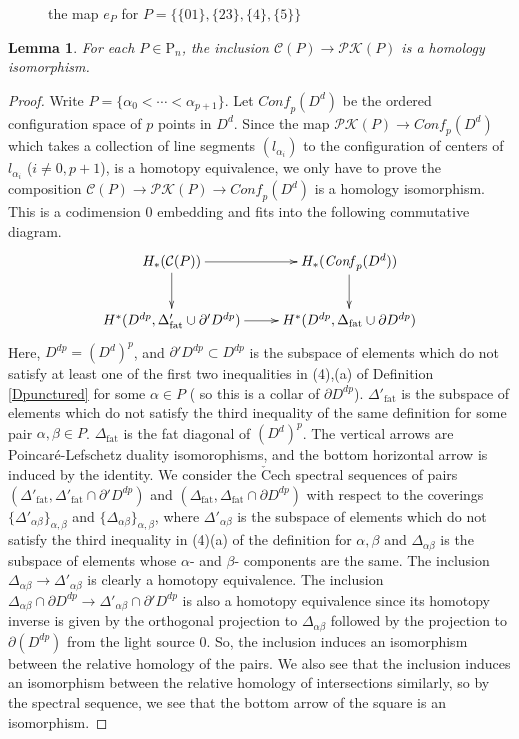 \documentclass[reqno]{amsart}
\theoremstyle{definition}
\theoremstyle{plain}
\newtheorem{lem}[defi]{Lemma}
\newcommand{\CECHC}{\check{\mathrm{C}}}
\newcommand{\PK}{\mathcal{PK}} %
\newcommand{\Conf}{\mathit{Conf}}
\newcommand{\fat}{\mathrm{fat}}
\newcommand{\PP}{\mathrm{P}} %
\begin{document}
\begin{figure}
\begin{center}

\end{center}
\caption{the map $e_{P}$ for $P=\{\{01\},\{23\},\{4\},\{5\}\}$} \label{Flinear_emb}
\end{figure}
\begin{lem}\label{Lnathomologyiso}
For each $P\in \PP_n$, the inclusion $\mathcal{C}(P)\to \PK(P)$ is a homology isomorphism.
\end{lem}
\begin{proof}
Write $P=\{\alpha_0<\cdots <\alpha_{p+1}\}$. Let $\Conf_p(D^d)$ be the ordered configuration space of $p$ points in $D^d$. Since the map $\PK(P)\to \Conf_p(D^d)$ which takes a collection of line segments $(l_{\alpha_i})$ to the configuration of centers of $l_{\alpha_i}$ ($i\not=0, p+1$), is a homotopy equivalence, we only have to prove the composition $\mathcal{C}(P)\to \PK(P)\to \Conf_p(D^d)$ is a homology isomorphism. This is a codimension $0$ embedding and fits into the following commutative diagram.
\[
\xymatrix{H_*(\mathcal{C}(P))\ar[r]\ar[d] & H_*(\Conf_p(D^d)) \ar[d] \\
H^*(D^{dp}, \Delta'_{\fat}\cup \partial'D^{dp})\ar[r] & H^*(D^{dp}, \Delta_{\fat}\cup \partial D^{dp})}
\]
Here, $D^{dp}=(D^d)^p$, and $\partial' D^{dp}\subset D^{dp}$ is the subspace of elements which do not satisfy at least one of the first two inequalities in (4),(a) of Definition  \ref{Dpunctured} for some $\alpha \in P$ ( so this is a collar of $\partial D^{dp}$). $\Delta'_{\fat}$ is the subspace of elements which do not satisfy the third inequality of the same definition for some pair $\alpha,\beta \in P$. $\Delta_{\fat}$ is the fat diagonal of $(D^d)^p$.   The vertical arrows are Poincar\'e-Lefschetz duality isomorophisms, and the bottom horizontal arrow is induced by the identity. We consider the $\CECHC$ech spectral sequences of pairs $(\Delta'_{\fat}, \Delta'_{\fat}\cap \partial'D^{dp})$ and $(\Delta_{\fat}, \Delta_{\fat}\cap \partial D^{dp})$ with respect to the coverings $\{\Delta'_{\alpha\beta}\}_{\alpha,\beta}$ and $\{\Delta_{\alpha \beta}\}_{\alpha,\beta}$, where $\Delta'_{\alpha\beta}$ is the subspace of elements which do not satisfy the third inequality in (4)(a) of the definition for $\alpha,\beta$ and $\Delta_{\alpha\beta}$ is the subspace of elements whose $\alpha$- and $\beta$- components are the same. The inclusion $\Delta_{\alpha\beta}\to \Delta'_{\alpha\beta}$ is clearly a homotopy equivalence. The inclusion $\Delta_{\alpha\beta}\cap \partial D^{dp}\to \Delta'_{\alpha\beta}\cap \partial' D^{dp}$ is also a homotopy equivalence since its homotopy inverse is given by the orthogonal projection to $\Delta_{\alpha\beta}$ followed by the projection to $\partial(D^{dp})$ from the light source $0$. So, the inclusion induces an isomorphism between the relative homology of the pairs. We also see that the inclusion  induces an isomorphism between the relative homology of intersections similarly, so by the  spectral sequence, we see that the bottom arrow of the square  is an isomorphism.
\end{proof}
\end{document}
